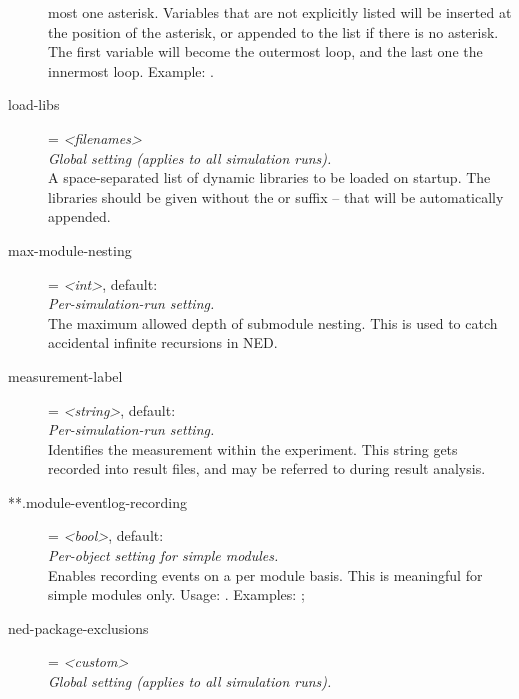 \begin{description}
    most one asterisk. Variables that are not explicitly listed will be
    inserted at the position of the asterisk, or appended to the list if there
    is no asterisk. The first variable will become the outermost loop, and the
    last one the innermost loop. Example:
    .
\item[load-libs] = \textit{<filenames>}\\
    \textit{Global setting (applies to all simulation runs).}\\
    A space-separated list of dynamic libraries to be loaded on startup. The
    libraries should be given without the  or
     suffix -- that will be automatically appended.
\item[max-module-nesting] = \textit{<int>}, default: \\
    \textit{Per-simulation-run setting.}\\
    The maximum allowed depth of submodule nesting. This is used to catch
    accidental infinite recursions in NED.
\item[measurement-label] = \textit{<string>}, default: \\
    \textit{Per-simulation-run setting.}\\
    Identifies the measurement within the experiment. This string gets recorded
    into result files, and may be referred to during result analysis.
\item[**.module-eventlog-recording] = \textit{<bool>}, default: \\
    \textit{Per-object setting for simple modules.}\\
    Enables recording events on a per module basis. This is meaningful for
    simple modules only. Usage:
    .
    Examples:
    ;
\item[ned-package-exclusions] = \textit{<custom>}\\
    \textit{Global setting (applies to all simulation runs).}\\

\end{description}
